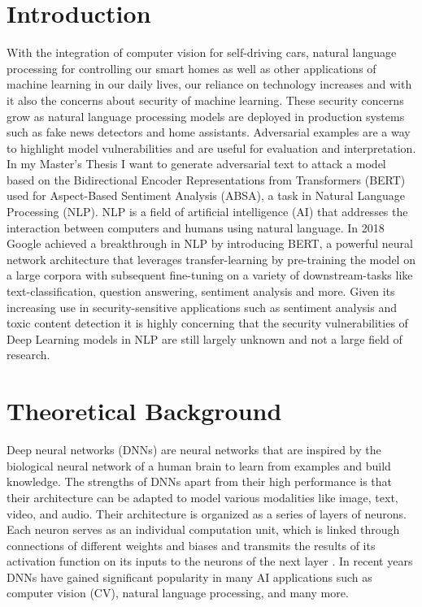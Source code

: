 \section{Introduction}

With the integration of computer vision for self-driving cars, natural language processing for controlling our smart homes as well as other applications of machine learning in our daily lives, our reliance on technology increases and with it also the concerns about security of machine learning. These security concerns grow as natural language processing models are deployed in production systems such as fake news detectors and home assistants. Adversarial examples are a way to highlight model vulnerabilities and are useful for evaluation and interpretation. 
In my Master's Thesis I want to generate adversarial text to attack a model based on the Bidirectional Encoder Representations from Transformers (BERT) used for Aspect-Based Sentiment Analysis (ABSA), a task in Natural Language Processing (NLP). NLP is a field of artificial intelligence (AI) that addresses the interaction between computers and humans using natural language. In 2018 Google achieved a breakthrough in NLP by introducing BERT, a powerful neural network architecture that leverages transfer-learning by pre-training the model on a large corpora with subsequent fine-tuning on a variety of downstream-tasks like text-classification, question answering, sentiment analysis and more. 
Given its increasing use in security-sensitive applications such as sentiment analysis and toxic content detection it is highly concerning that the security vulnerabilities of Deep Learning models in NLP are still largely unknown and not a large field of research.

\section{Theoretical Background}
Deep neural networks (DNNs) are neural networks that are inspired by the biological neural network of a human brain to learn from examples and build knowledge. 
The strengths of DNNs apart from their high performance is that their architecture can be adapted to model various modalities like image, text, video, and audio.
Their architecture is organized as a series of layers of neurons. Each neuron serves as an individual computation unit, which is linked through connections of different weights and biases and transmits the results of its activation function on its inputs to the neurons of the next layer \cite{zhang2019adversarial}.
In recent years DNNs have gained significant popularity in many AI applications such as computer vision (CV), natural language processing, and many more.

